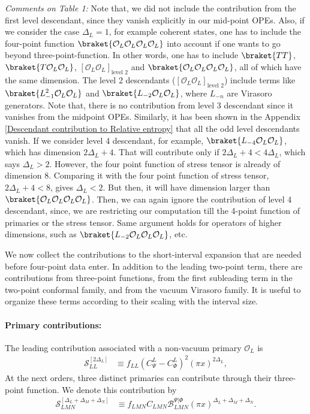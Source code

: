 \documentclass[11pt]{article}
\newcommand{\mO}{\mathcal{O}}
\begin{document}
\textit{Comments on Table 1:} Note that, we did not include the contribution from the first level descendant, since they vanish explicitly in our mid-point OPEs. Also, if we consider the case $\Delta_L=1$, for example coherent states, one has to include the four-point function $\braket{\mO_L\mO_L\mO_L\mO_L}$ into account if one wants to go beyond three-point-function. In other words, one has to include $\braket{TT}$, $\braket{T\mO_L\mO_L}$, $[\mO_L\mO_L]_{\text{level 2}}$ and $\braket{\mO_L\mO_L\mO_L\mO_L}$, all of which have the same dimension. The level 2 descendants ($[\mO_L\mO_L]_{\text{level 2}}$) include terms like $\braket{L_{-1}^2\mO_L\mO_L}$ and $\braket{L_{-2}\mO_L\mO_L}$, where $L_{-n}$ are Virasoro generators. Note that, there is no contribution from level 3 descendant since it vanishes from the midpoint OPEs. Similarly, it has been shown in the Appendix \ref{Descendant contribution to Relative entropy} that all the odd level descendants vanish. If we consider level 4 descendant, for example, $\braket{L_{-4}\mO_L\mO_L}$, which has dimension $2\Delta_L+4$. That will contribute only if $2\Delta_L+4 <4\Delta_L$, which says $\Delta_L>2$. However, the four point function of stress tensor is already of dimension 8. Comparing it with the four point function of stress tensor, $2\Delta_L+4<8$, gives $\Delta_L<2$. But then, it will have dimension larger than $\braket{\mO_L\mO_L\mO_L\mO_L}$. Then, we can again ignore the contribution of level 4 descendant, since, we are restricting our computation till the 4-point function of primaries or the stress tensor. Same argument holds for operators of higher dimensions, such as $\braket{L_{-2}\mO_L\mO_L\mO_L}$, etc. 

We now collect the contributions to the short-interval expansion that are
needed before four-point data enter. In addition to the leading two-point
term, there are contributions from three-point functions, from the first
subleading term in the two-point conformal family, and from the vacuum
Virasoro family. It is useful to organize these terms according to their
scaling with the interval size. 
\paragraph{Primary contributions:}
The leading contribution associated with a non-vacuum primary
$\mathcal O_L$ is
\begin{align}
    \mathcal S_{LL}^{[2\Delta_L]}
    &\equiv
    f_{LL}(C^L_{\Psi}-C^L_{\Phi})^2(\pi x)^{2\Delta_L},
\end{align}
At the next orders, three distinct primaries can contribute through their
three-point function. We denote this contribution by
\begin{align}
    \mathcal S_{LMN}^{[\Delta_L+\Delta_M+\Delta_N]}
    &\equiv
    f_{LMN}C_{LMN}
    \mathcal B_{LMN}^{\Psi|\Phi}
    (\pi x)^{\Delta_L+\Delta_M+\Delta_N}.
\end{align}
\end{document}
